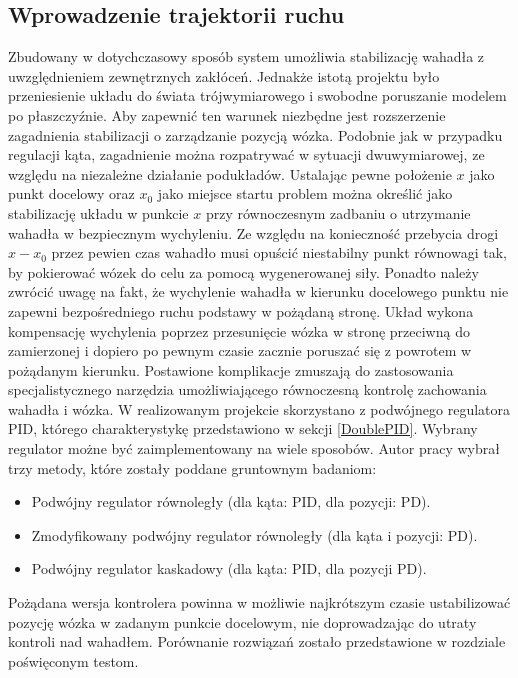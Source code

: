 \documentclass[12pt, oneside]{report}
\theoremstyle{definition}
\begin{document}
\subsection{Wprowadzenie trajektorii ruchu}
Zbudowany w dotychczasowy sposób system umożliwia stabilizację wahadła z uwzględnieniem zewnętrznych zakłóceń. Jednakże istotą projektu było przeniesienie układu do świata trójwymiarowego i swobodne poruszanie modelem po płaszczyźnie. Aby zapewnić ten warunek niezbędne jest rozszerzenie zagadnienia stabilizacji o zarządzanie pozycją wózka. Podobnie jak w przypadku regulacji kąta, zagadnienie można rozpatrywać w sytuacji dwuwymiarowej, ze względu na niezależne działanie podukładów. Ustalając pewne położenie $x$ jako punkt docelowy oraz $x_0$ jako miejsce startu problem można określić jako stabilizację układu w punkcie $x$ przy równoczesnym zadbaniu o utrzymanie wahadła w bezpiecznym wychyleniu. Ze względu na konieczność przebycia drogi $x - x_0$ przez pewien czas wahadło musi opuścić niestabilny punkt równowagi tak, by pokierować wózek do celu za pomocą wygenerowanej siły. Ponadto należy zwrócić uwagę na fakt, że wychylenie wahadła w kierunku docelowego punktu nie zapewni bezpośredniego ruchu podstawy w pożądaną stronę. Układ wykona kompensację wychylenia poprzez przesunięcie wózka w stronę przeciwną do zamierzonej i dopiero po pewnym czasie zacznie poruszać się z powrotem w pożądanym kierunku. Postawione komplikacje zmuszają do zastosowania specjalistycznego narzędzia umożliwiającego równoczesną kontrolę zachowania wahadła i wózka. W realizowanym projekcie skorzystano z podwójnego regulatora PID, którego charakterystykę przedstawiono w sekcji \ref{DoublePID}. Wybrany regulator możne być zaimplementowany na wiele sposobów. Autor pracy wybrał trzy metody, które zostały poddane gruntownym badaniom:
\begin{itemize}
\item Podwójny regulator równoległy (dla kąta: PID, dla pozycji: PD).
\item Zmodyfikowany podwójny regulator równoległy (dla kąta i pozycji: PD).
\item Podwójny regulator kaskadowy (dla kąta: PID, dla pozycji PD).
\end{itemize}

Pożądana wersja kontrolera powinna w możliwie najkrótszym czasie ustabilizować pozycję wózka w zadanym punkcie docelowym, nie doprowadzając do utraty kontroli nad wahadłem. Porównanie rozwiązań zostało przedstawione w rozdziale poświęconym testom. 
\end{document}
